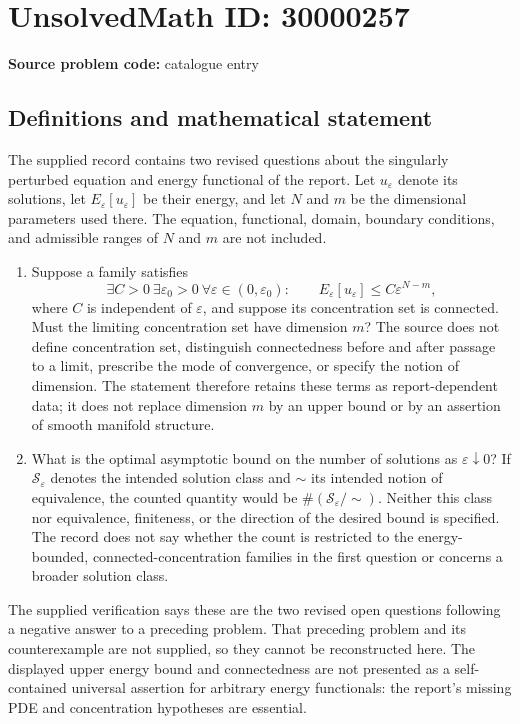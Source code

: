 \documentclass[11pt]{article}
\begin{document}
\section*{UnsolvedMath ID: 30000257}
\textbf{Source problem code:} catalogue entry
\subsection{Definitions and mathematical statement}
The supplied record contains two revised questions about the singularly perturbed equation and energy functional of the report. Let $u_\varepsilon$ denote its solutions, let $E_\varepsilon[u_\varepsilon]$ be their energy, and let $N$ and $m$ be the dimensional parameters used there. The equation, functional, domain, boundary conditions, and admissible ranges of $N$ and $m$ are not included.

\begin{enumerate}
\item Suppose a family satisfies
\[
 \exists C>0\ \exists\varepsilon_0>0\ \forall\varepsilon\in(0,\varepsilon_0):\qquad
 E_\varepsilon[u_\varepsilon]\le C\varepsilon^{N-m},
\]
where $C$ is independent of $\varepsilon$, and suppose its concentration set is connected. Must the limiting concentration set have dimension $m$? The source does not define concentration set, distinguish connectedness before and after passage to a limit, prescribe the mode of convergence, or specify the notion of dimension. The statement therefore retains these terms as report-dependent data; it does not replace dimension $m$ by an upper bound or by an assertion of smooth manifold structure.
\item What is the optimal asymptotic bound on the number of solutions as $\varepsilon\downarrow0$? If $\mathcal S_\varepsilon$ denotes the intended solution class and $\sim$ its intended notion of equivalence, the counted quantity would be $\#(\mathcal S_\varepsilon/\!\sim)$. Neither this class nor equivalence, finiteness, or the direction of the desired bound is specified. The record does not say whether the count is restricted to the energy-bounded, connected-concentration families in the first question or concerns a broader solution class.
\end{enumerate}

The supplied verification says these are the two revised open questions following a negative answer to a preceding problem. That preceding problem and its counterexample are not supplied, so they cannot be reconstructed here. The displayed upper energy bound and connectedness are not presented as a self-contained universal assertion for arbitrary energy functionals: the report's missing PDE and concentration hypotheses are essential.
\end{document}
